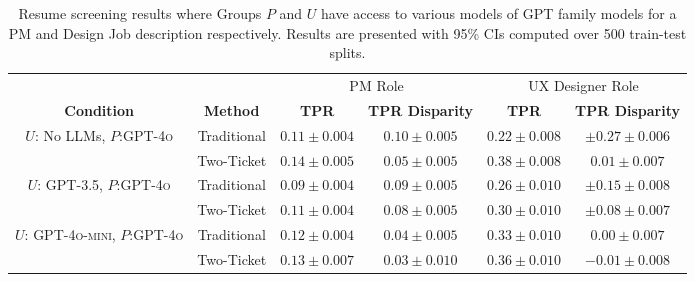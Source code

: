\begin{table*}[t]
\label{tab:main-results}
\small
    \centering
    \begin{tabular}{cccccc}
    \toprule
        && \multicolumn{2}{c}{PM Role} & \multicolumn{2}{c}{UX Designer Role} \\

        \textbf{Condition} & \textbf{Method} & \textbf{TPR} & \textbf{TPR Disparity} &   \textbf{TPR} & \textbf{TPR Disparity} \\
        \midrule
        $U$:    No LLMs, $P$:\textsc{GPT-4o} & Traditional    &$0.11 \pm 0.004$  & $0.10 \pm 0.005$ & $0.22 \pm 0.008$  & $ \pm0.27 \pm 0.006$\\
        & Two-Ticket     & $0.14 \pm 0.005$  & $ 0.05 \pm 0.005$   & $0.38 \pm 0.008$  & $ 0.01 \pm 0.007$\\
        \midrule
        $U$:    \textsc{GPT-3.5}, $P$:\textsc{GPT-4o} & Traditional    & $0.09 \pm 0.004$  & $ 0.09 \pm 0.005$ & $0.26 \pm 0.010$  & $ \pm0.15 \pm 0.008$ \\
        & Two-Ticket     & $0.11 \pm 0.004$  & $ 0.08 \pm 0.005$   & $0.30 \pm 0.010$  & $ \pm0.08 \pm 0.007$\\
        \midrule
        $U$:    \textsc{GPT-4o-mini}, $P$:\textsc{GPT-4o} 
        & Traditional    & $0.12 \pm 0.004$  & $ 0.04 \pm 0.005$ & $0.33 \pm 0.010$  & $ 0.00 \pm 0.007$  \\
        & Two-Ticket     & $0.13 \pm 0.007$  & $ 0.03 \pm 0.010$  & $0.36 \pm 0.010$  & $-0.01 \pm 0.008$ \\
        \bottomrule
    \end{tabular}
    \caption{Resume screening results where Groups $P$ and $U$ have access to various models of \textsc{GPT} family models for a PM and Design Job description respectively. Results are presented with 95\% CIs computed over 500 train-test splits.}
    \label{tab: combined_results_all}
\end{table*}

